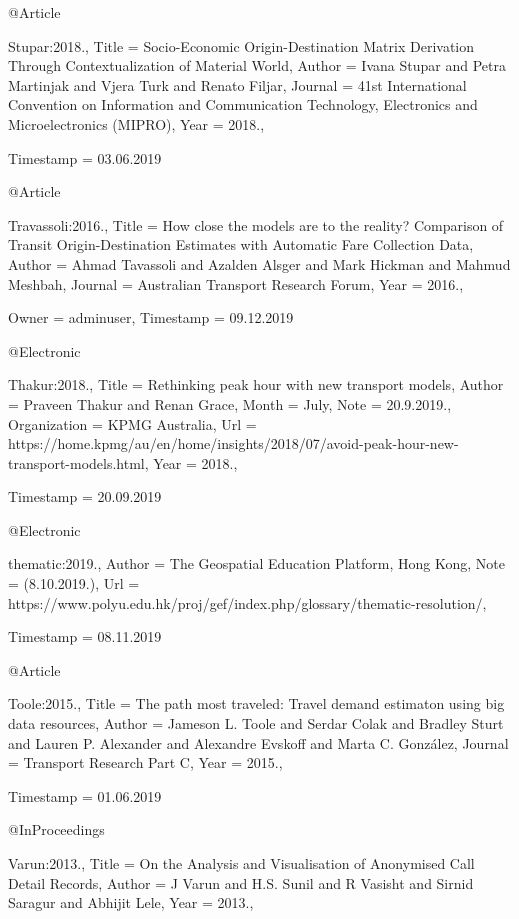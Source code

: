 {{{@Article{Stupar:2018.,
  Title                    = {{Socio-Economic Origin-Destination Matrix Derivation Through Contextualization of Material World}},
  Author                   = {Ivana Stupar and Petra Martinjak and Vjera Turk and Renato Filjar},
  Journal                  = {41st International Convention on Information and Communication Technology, Electronics and Microelectronics (MIPRO)},
  Year                     = {2018.},

  Timestamp                = {03.06.2019}
}

@Article{Travassoli:2016.,
  Title                    = {{How close the models are to the reality? Comparison of Transit Origin-Destination Estimates with Automatic Fare Collection Data}},
  Author                   = {Ahmad Tavassoli and Azalden Alsger and Mark Hickman and Mahmud Meshbah},
  Journal                  = {Australian Transport Research Forum},
  Year                     = {2016.},

  Owner                    = {adminuser},
  Timestamp                = {09.12.2019}
}

@Electronic{Thakur:2018.,
  Title                    = {Rethinking peak hour with new transport models},
  Author                   = {Praveen Thakur and Renan Grace},
  Month                    = {July},
  Note                     = {20.9.2019.},
  Organization             = {KPMG Australia},
  Url                      = {https://home.kpmg/au/en/home/insights/2018/07/avoid-peak-hour-new-transport-models.html},
  Year                     = {2018.},

  Timestamp                = {20.09.2019}
}

@Electronic{thematic:2019.,
  Author                   = {The Geospatial Education Platform, Hong Kong},
  Note                     = {(8.10.2019.)},
  Url                      = {https://www.polyu.edu.hk/proj/gef/index.php/glossary/thematic-resolution/},

  Timestamp                = {08.11.2019}
}

@Article{Toole:2015.,
  Title                    = {The path most traveled: {Travel} demand estimaton using big data resources},
  Author                   = {Jameson L. Toole and Serdar Colak and Bradley Sturt and Lauren P. Alexander and Alexandre Evskoff and Marta C. Gonz\'alez},
  Journal                  = {Transport Research Part C},
  Year                     = {2015.},

  Timestamp                = {01.06.2019}
}

@InProceedings{Varun:2013.,
  Title                    = {{On the Analysis and Visualisation of Anonymised Call Detail Records}},
  Author                   = {J Varun and H.S. Sunil and R Vasisht and Sirnid Saragur and Abhijit Lele},
  Year                     = {2013.},

}}}}
